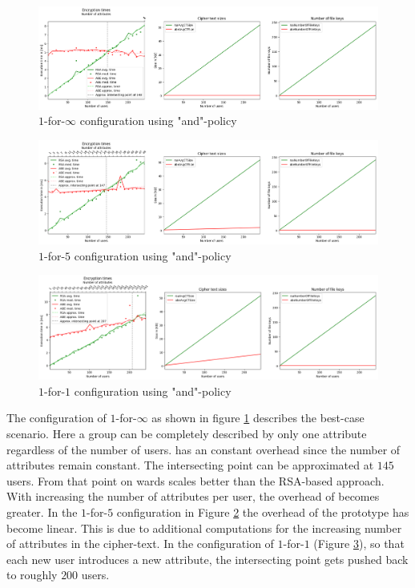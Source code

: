 \begin{figure}[!t]
\centering
    \includegraphics[width=\linewidth]{img/eval-and-policy/encrypt_incrementing_10.png}
    \caption{$1$-for-$\infty$ configuration using "and"-policy}
    \label{fig:1-for-infty-and}
\end{figure}
\begin{figure}[!t]
\centering
    \includegraphics[width=\linewidth]{img/eval-and-policy/encrypt_incrementing_10_attribute_increment_1per5User.png}
    \caption{$1$-for-$5$ configuration using "and"-policy}
    \label{fig:1-for-5-and}
\end{figure}
\begin{figure}[!t]
\centering
    \includegraphics[width=\linewidth]{img/eval-and-policy/encrypt_incrementing_10_attribute_increment_1per1User.png}
    \caption{$1$-for-$1$ configuration using "and"-policy}
    \label{fig:1-for-1-and}
\end{figure}

The configuration of $1$-for-$\infty$ as shown in figure \ref{fig:1-for-infty-and} describes the best-case scenario. Here a group can be completely described by only one attribute regardless of the number of users. \name has an constant overhead since the number of attributes remain constant. The intersecting point can be approximated at $145$ users. From that point on wards \name scales better than the RSA-based approach. With increasing the number of attributes per user, the overhead of \name becomes greater. In the $1$-for-$5$ configuration in Figure \ref{fig:1-for-5-and} the overhead of the prototype has become linear. This is due to additional computations for the increasing number of attributes in the cipher-text. In the configuration of $1$-for-$1$  (Figure \ref{fig:1-for-1-and}), so that each new user introduces a new attribute, the intersecting point gets pushed back to roughly $200$ users. 

